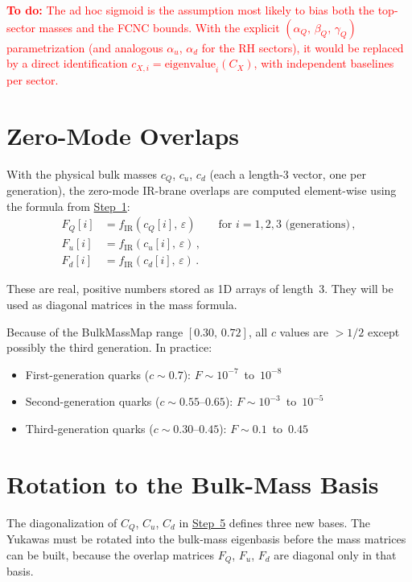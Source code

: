 \documentclass[11pt]{article}
\begin{document}
\textcolor{red}{\textbf{To do:} The ad hoc sigmoid is the assumption most
likely to bias both the top-sector masses and the FCNC bounds.  With the
explicit $(\alpha_Q,\,\beta_Q,\,\gamma_Q)$ parametrization (and analogous
$\alpha_u$, $\alpha_d$ for the RH sectors), it would be replaced by a direct
identification $c_{X,i} = \text{eigenvalue}_i(C_X)$, with independent baselines
per sector.}

\section{Zero-Mode Overlaps}
\label{sec:step6}

With the physical bulk masses $c_Q$, $c_u$, $c_d$ (each a length-3 vector, one
per generation), the zero-mode IR-brane overlaps are computed element-wise using
the formula from \hyperref[sec:step1]{Step~1}:
\begin{align}
  F_Q[i] &= f_{\mathrm{IR}}(c_Q[i],\,\varepsilon)
    \qquad\text{for } i = 1,2,3 \text{ (generations)}\,, \\
  F_u[i] &= f_{\mathrm{IR}}(c_u[i],\,\varepsilon)\,, \\
  F_d[i] &= f_{\mathrm{IR}}(c_d[i],\,\varepsilon)\,.
\end{align}

These are real, positive numbers stored as 1D arrays of length~3.  They will be
used as diagonal matrices in the mass formula.

Because of the BulkMassMap range $[0.30,\,0.72]$, all $c$ values are $> 1/2$
except possibly the third generation.  In practice:
\begin{itemize}
  \item First-generation quarks ($c \sim 0.7$):
    $F \sim 10^{-7}$~to~$10^{-8}$
  \item Second-generation quarks ($c \sim 0.55$--$0.65$):
    $F \sim 10^{-3}$~to~$10^{-5}$
  \item Third-generation quarks ($c \sim 0.30$--$0.45$):
    $F \sim 0.1$~to~$0.45$
\end{itemize}

\section{Rotation to the Bulk-Mass Basis}
\label{sec:step7}

The diagonalization of $C_Q$, $C_u$, $C_d$ in \hyperref[sec:step5]{Step~5}
defines three new bases.  The Yukawas must be rotated into the bulk-mass
eigenbasis before the mass matrices can be built, because the overlap matrices
$F_Q$, $F_u$, $F_d$ are diagonal only in that basis.
\end{document}
